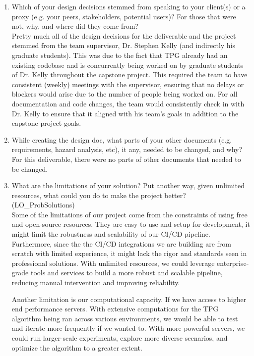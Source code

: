 \documentclass[12pt, titlepage]{article}
\begin{document}
\begin{enumerate}
  \item Which of your design decisions stemmed from speaking to your client(s)
  or a proxy (e.g. your peers, stakeholders, potential users)? For those that
  were not, why, and where did they come from?\\
  
  Pretty much all of the design decisions for the deliverable and the project stemmed from the team supervisor, Dr. Stephen Kelly (and indirectly his graduate students). This was due to the fact that TPG already had an existing codebase and is concurrently being worked on by graduate students of Dr. Kelly throughout the capstone project. This required the team to have consistent (weekly) meetings with the supervisor, ensuring that no delays or blockers would arise due to the number of people being worked on. For all documentation and code changes, the team would consistently check in with Dr. Kelly to ensure that it aligned with his team’s goals in addition to the capstone project goals.


  \item While creating the design doc, what parts of your other documents (e.g.
  requirements, hazard analysis, etc), it any, needed to be changed, and why?\\
  
  For this deliverable, there were no parts of other documents that needed to be changed.

  \item What are the limitations of your solution?  Put another way, given
  unlimited resources, what could you do to make the project better? (LO\_ProbSolutions)\\
  
  Some of the limitations of our project come from the constraints of using free and open-source resources. They are easy to use and setup for development, it might limit the robustness and scalability of our CI/CD pipeline. Furthermore, since the the CI/CD integrations we are building are from scratch with limited experience, it might lack the rigor and standards seen in professional solutions. With unlimited resources, we could leverage enterprise-grade tools and services to build a more robust and scalable pipeline, reducing manual intervention and improving reliability.


Another limitation is our computational capacity. If we have access to higher end performance servers. With extensive computations for the TPG algorithm being ran across various environments, we would be able to test and iterate more frequently if we wanted to. With more powerful servers, we could run larger-scale experiments, explore more diverse scenarios, and optimize the algorithm to a greater extent.


\end{enumerate}
\end{document}
